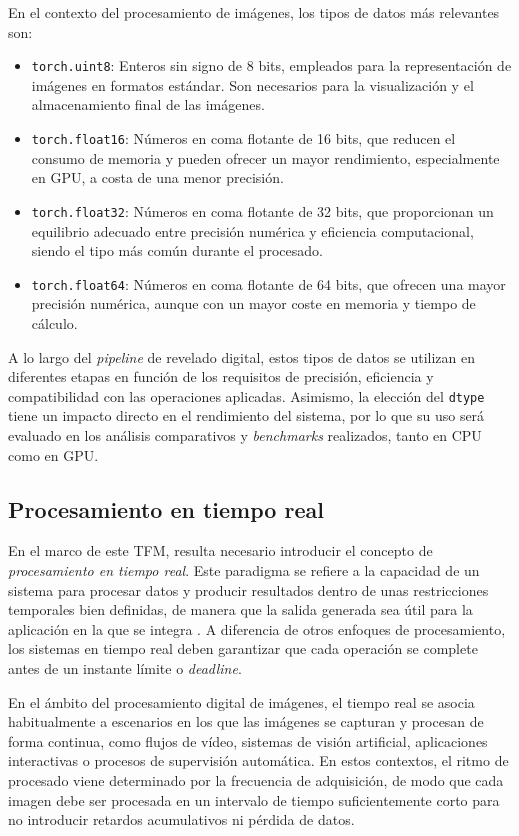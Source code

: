 \noindent En el contexto del procesamiento de imágenes, los tipos de datos más relevantes son:
\begin{itemize}
    \item \texttt{torch.uint8}: Enteros sin signo de 8 bits, empleados para la representación de imágenes en formatos estándar. Son necesarios para la visualización y el almacenamiento final de las imágenes.
    \item \texttt{torch.float16}: Números en coma flotante de 16 bits, que reducen el consumo de memoria y pueden ofrecer un mayor rendimiento, especialmente en GPU, a costa de una menor precisión.
    \item \texttt{torch.float32}: Números en coma flotante de 32 bits, que proporcionan un equilibrio adecuado entre precisión numérica y eficiencia computacional, siendo el tipo más común durante el procesado.
    \item \texttt{torch.float64}: Números en coma flotante de 64 bits, que ofrecen una mayor precisión numérica, aunque con un mayor coste en memoria y tiempo de cálculo.
\end{itemize}

A lo largo del \textit{pipeline} de revelado digital, estos tipos de datos se utilizan en 
diferentes etapas en función de los requisitos de precisión, eficiencia y compatibilidad con las 
operaciones aplicadas. Asimismo, la elección del \texttt{dtype} tiene un impacto directo en el 
rendimiento del sistema, por lo que su uso será evaluado en los análisis comparativos y 
\textit{benchmarks} realizados, tanto en CPU como en GPU.

\newpage

\subsection{Procesamiento en tiempo real} \label{subsec:3_7_procesamiento_tiempo_real}
En el marco de este TFM, resulta necesario introducir el concepto de \textit{procesamiento en tiempo real}.
Este paradigma se refiere a la capacidad de un sistema para procesar datos y producir resultados dentro
de unas restricciones temporales bien definidas, de manera que la salida generada sea útil para la aplicación
en la que se integra \cite{rt_image_processing}. A diferencia de otros enfoques de procesamiento, los sistemas 
en tiempo real deben garantizar que cada operación se complete antes de un instante límite o \textit{deadline}.

En el ámbito del procesamiento digital de imágenes, el tiempo real se asocia habitualmente a escenarios
en los que las imágenes se capturan y procesan de forma continua, como flujos de vídeo, sistemas de visión
artificial, aplicaciones interactivas o procesos de supervisión automática. En estos contextos, el ritmo de
procesado viene determinado por la frecuencia de adquisición, de modo que cada imagen debe ser procesada
en un intervalo de tiempo suficientemente corto para no introducir retardos acumulativos ni pérdida de datos.


